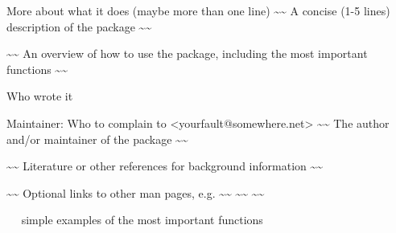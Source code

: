 \begin{Description}\relax
More about what it does (maybe more than one line)
\textasciitilde{}\textasciitilde{} A concise (1-5 lines) description of the package \textasciitilde{}\textasciitilde{}
\end{Description}
\begin{Details}\relax
{}
\textasciitilde{}\textasciitilde{} An overview of how to use the package, including the most important functions \textasciitilde{}\textasciitilde{}
\end{Details}
\begin{Author}\relax
Who wrote it

Maintainer: Who to complain to \textless{}yourfault@somewhere.net\textgreater{}
\textasciitilde{}\textasciitilde{} The author and/or maintainer of the package \textasciitilde{}\textasciitilde{}
\end{Author}
\begin{References}\relax
\textasciitilde{}\textasciitilde{} Literature or other references for background information \textasciitilde{}\textasciitilde{}
\end{References}
\begin{SeeAlso}\relax
\textasciitilde{}\textasciitilde{} Optional links to other man pages, e.g. \textasciitilde{}\textasciitilde{}
\textasciitilde{}\textasciitilde{}  \textasciitilde{}\textasciitilde{}
\end{SeeAlso}
\begin{Examples}
\begin{ExampleCode}
~~ simple examples of the most important functions ~~
\end{ExampleCode}
\end{Examples}


